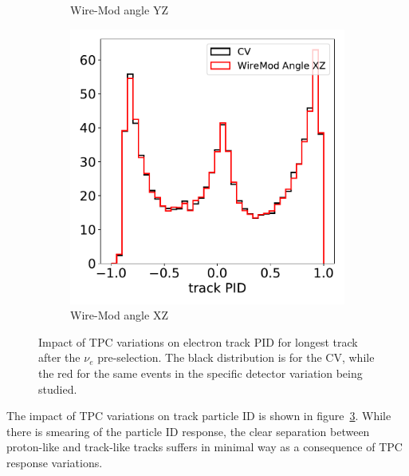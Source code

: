 \documentclass[a4paper]{article}
\begin{document}
\begin{figure}[H]
\begin{center}
\begin{subfigure}[b]{0.19\textwidth}
    \caption{\label{fig:detsys:trkpid:WMAYZ}Wire-Mod angle YZ}
    \end{subfigure}
    \begin{subfigure}[b]{0.19\textwidth}
    \centering
    \includegraphics[width=1.00\textwidth]{detsys/trkpid/trkpid_03232020_WireMod_Angle_XZ.pdf}
    \caption{\label{fig:detsys:trkpid:WMAXZ}Wire-Mod angle XZ}
    \end{subfigure}
\caption{\label{fig:detsys:trkpid}Impact of TPC variations on electron track PID for longest track after the $\nu_e$ pre-selection. The black distribution is for the CV, while the red for the same events in the specific detector variation being studied.}
\end{center}
\end{figure}

The impact of TPC variations on track particle ID is shown in figure~\ref{fig:detsys:trkpid}. While there is smearing of the particle ID response, the clear separation between proton-like and track-like tracks suffers in minimal way as a consequence of TPC response variations.
\end{document}
